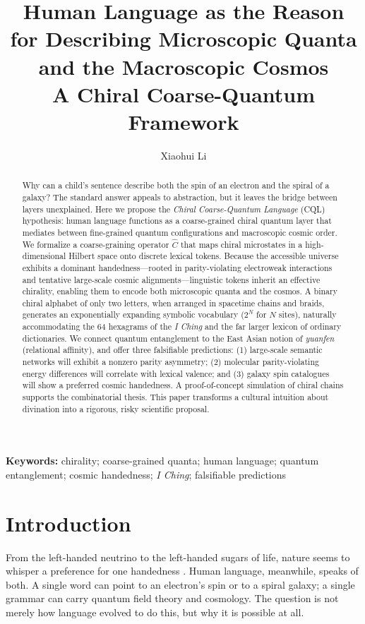 \documentclass[11pt,a4paper]{article}
\title{\textbf{Human Language as the Reason for Describing Microscopic Quanta and the Macroscopic Cosmos}\\[0.3em]
\large A Chiral Coarse-Quantum Framework}
\author[1]{Xiaohui Li}
\affil[1]{Independent Researcher, Baoji, China}
\affil[ ]{Correspondence: Xiaohui Li (email: danceluck@163.com)}
\affil[ ]{ORCID: 0009-0003-8233-7191; Data and code: \url{https://github.com/xiaohui-li-lab/}}
\date{}
\begin{document}
\maketitle

\begin{abstract}
Why can a child’s sentence describe both the spin of an electron and the spiral of a galaxy? The standard answer appeals to abstraction, but it leaves the bridge between layers unexplained. Here we propose the \emph{Chiral Coarse-Quantum Language} (CQL) hypothesis: human language functions as a coarse-grained chiral quantum layer that mediates between fine-grained quantum configurations and macroscopic cosmic order. We formalize a coarse-graining operator $\hat C$ that maps chiral microstates in a high-dimensional Hilbert space onto discrete lexical tokens. Because the accessible universe exhibits a dominant handedness---rooted in parity-violating electroweak interactions and tentative large-scale cosmic alignments---linguistic tokens inherit an effective chirality, enabling them to encode both microscopic quanta and the cosmos. A binary chiral alphabet of only two letters, when arranged in spacetime chains and braids, generates an exponentially expanding symbolic vocabulary ($2^N$ for $N$ sites), naturally accommodating the 64 hexagrams of the \emph{I Ching} and the far larger lexicon of ordinary dictionaries. We connect quantum entanglement to the East Asian notion of \emph{yuanfen} (relational affinity), and offer three falsifiable predictions: (1) large-scale semantic networks will exhibit a nonzero parity asymmetry; (2) molecular parity-violating energy differences will correlate with lexical valence; and (3) galaxy spin catalogues will show a preferred cosmic handedness. A proof-of-concept simulation of chiral chains supports the combinatorial thesis. This paper transforms a cultural intuition about divination into a rigorous, risky scientific proposal.
\end{abstract}

\textbf{Keywords:} chirality; coarse-grained quanta; human language; quantum entanglement; cosmic handedness; \emph{I Ching}; falsifiable predictions

\linenumbers

\section{Introduction}

From the left-handed neutrino to the left-handed sugars of life, nature seems to whisper a preference for one handedness \cite{wu57, pasteur48, quack02}. Human language, meanwhile, speaks of both. A single word can point to an electron’s spin or to a spiral galaxy; a single grammar can carry quantum field theory and cosmology. The question is not merely how language evolved to do this, but why it is possible at all.
\end{document}
